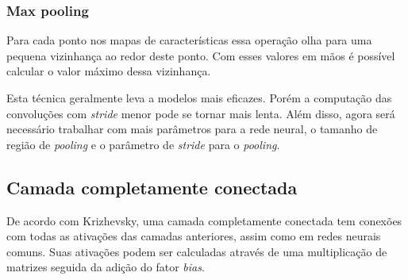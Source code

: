 \subsubsection{Max pooling}

Para cada ponto nos mapas de características essa operação
olha para uma pequena vizinhança ao redor deste ponto. Com esses
valores em mãos é possível calcular o valor máximo dessa vizinhança.

Esta técnica geralmente leva a modelos mais eficazes. Porém a
computação das convoluções com \textit{stride} menor pode se tornar mais
lenta. Além disso, agora será necessário trabalhar com mais parâmetros
para a rede neural, o tamanho de região de \textit{pooling} e o
parâmetro de \textit{stride} para o \textit{pooling}.

\subsection{Camada completamente conectada}

De acordo com Krizhevsky\cite{Krizhevsky}, uma camada completamente
conectada tem conexões com todas as ativações das camadas anteriores,
assim como em redes neurais comuns. Suas ativações podem ser
calculadas através de uma multiplicação de matrizes seguida da adição
do fator \textit{bias}.
